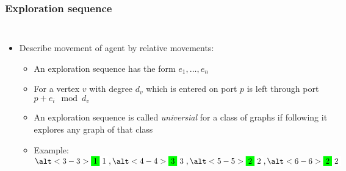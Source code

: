 \documentclass{beamer}
\begin{document}
\begin{frame}
  \frametitle{Exploration sequence}
  \begin{columns}
    \begin{itemize}
      \item Describe movement of agent by relative movements:
        \begin{itemize}
          \item An exploration sequence has the form $e_{1},\dots, e_{n}$
          \item For a vertex $v$ with degree $d_{v}$ which is entered on port
            $p$ is left through port $p + e_{i}\mod d_{v}$
          \item An exploration sequence is called \emph{universial} for a class
            of graphs if following it explores any graph of that class
          \item<2->[$\rightarrow$] Example:
            $\alt<3-3>{\colorbox{green}{1}}{\colorbox{white!0}{1}},
            \alt<4-4>{\colorbox{green}{3}}{\colorbox{white!0}{3}},
            \alt<5-5>{\colorbox{green}{2}}{\colorbox{white!0}{2}},
            \alt<6-6>{\colorbox{green}{2}}{\colorbox{white!0}{2}}$
        \end{itemize}
    \end{itemize}
    \begin{center}
      \resizebox{\textwidth}{!}{}
    \end{center}
  \end{columns}
\end{frame}
\end{document}
